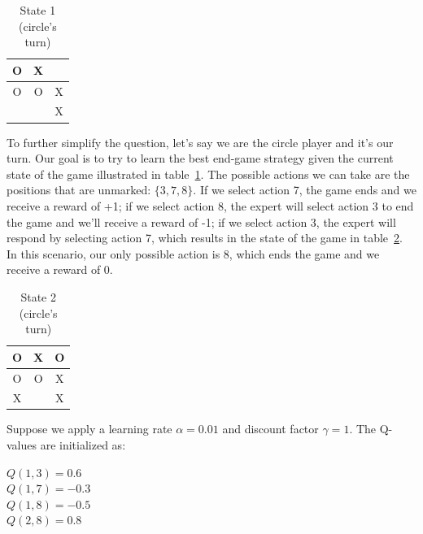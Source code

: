\documentclass[11pt]{article}
\numberwithin{equation}{section} %
\numberwithin{figure}{section} %
\numberwithin{table}{section} %
\begin{document}
\begin{table}[H]
\begin{center}
  \begin{tabular}{  c | c | c  }
    O & X &  \\ \hline
    O & O & X \\ \hline
      &   & X \\ 
  \end{tabular}
 \caption{State 1 (circle's turn)}
 \label{table:state1}
\end{center}
\end{table}

To further simplify the question, let's say we are the circle player and it's our turn. Our goal is to try to learn the best end-game strategy given the current state of the game illustrated in table~\ref{table:state1}. The possible actions we can take are the positions that are unmarked: $\big\{ 3, 7, 8 \big\}$. If we select action 7, the game ends and we receive a reward of +1; if we select action 8, the expert will select action 3 to end the game and we'll receive a reward of -1; if we select action 3, the expert will respond by selecting action 7, which results in the state of the game in table~\ref{table:state2}. In this scenario, our only possible action is 8, which ends the game and we receive a reward of 0.

\begin{table}[H]
\begin{center}
  \begin{tabular}{  c | c | c  }
    O & X & O \\ \hline
    O & O & X \\ \hline
    X &   & X \\ 
  \end{tabular}
 \caption{State 2 (circle's turn)}
 \label{table:state2}
\end{center}
\end{table}

Suppose we apply a learning rate $\alpha = 0.01$ and discount factor $\gamma = 1$. The Q-values are initialized as:

\begin{center}
$Q(1, 3) = 0.6$\\
$Q(1, 7) = -0.3$\\
$Q(1, 8) = -0.5$\\
$Q(2, 8) = 0.8$\\
\end{center}
\end{document}
